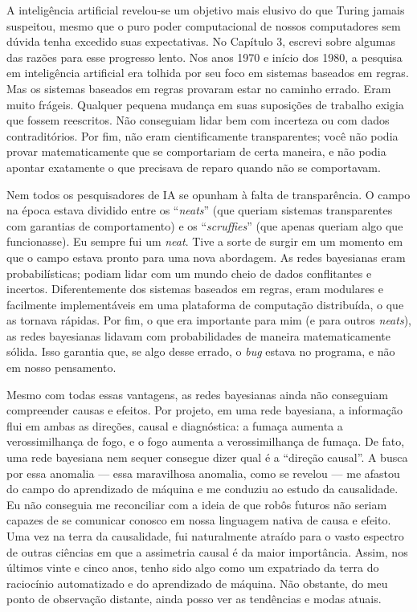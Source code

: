 \documentclass[11pt,a5paper,twoside]{book}
\begin{document}
A inteligência artificial revelou-se um objetivo mais elusivo do que Turing jamais suspeitou, mesmo que o puro poder computacional de nossos computadores sem dúvida tenha excedido suas expectativas. No Capítulo 3, escrevi sobre algumas das razões para esse progresso lento. Nos anos 1970 e início dos 1980, a pesquisa em inteligência artificial era tolhida por seu foco em sistemas baseados em regras. Mas os sistemas baseados em regras provaram estar no caminho errado. Eram muito frágeis. Qualquer pequena mudança em suas suposições de trabalho exigia que fossem reescritos. Não conseguiam lidar bem com incerteza ou com dados contraditórios. Por fim, não eram cientificamente transparentes; você não podia provar matematicamente que se comportariam de certa maneira, e não podia apontar exatamente o que precisava de reparo quando não se comportavam.

Nem todos os pesquisadores de IA se opunham à falta de transparência. O campo na época estava dividido entre os “\textit{neats}” (que queriam sistemas transparentes com garantias de comportamento) e os “\textit{scruffies}” (que apenas queriam algo que funcionasse). Eu sempre fui um \textit{neat}. Tive a sorte de surgir em um momento em que o campo estava pronto para uma nova abordagem. As redes bayesianas eram probabilísticas; podiam lidar com um mundo cheio de dados conflitantes e incertos. Diferentemente dos sistemas baseados em regras, eram modulares e facilmente implementáveis em uma plataforma de computação distribuída, o que as tornava rápidas. Por fim, o que era importante para mim (e para outros \textit{neats}), as redes bayesianas lidavam com probabilidades de maneira matematicamente sólida. Isso garantia que, se algo desse errado, o \textit{bug} estava no programa, e não em nosso pensamento.

Mesmo com todas essas vantagens, as redes bayesianas ainda não conseguiam compreender causas e efeitos. Por projeto, em uma rede bayesiana, a informação flui em ambas as direções, causal e diagnóstica: a fumaça aumenta a verossimilhança de fogo, e o fogo aumenta a verossimilhança de fumaça. De fato, uma rede bayesiana nem sequer consegue dizer qual é a “direção causal”. A busca por essa anomalia — essa maravilhosa anomalia, como se revelou — me afastou do campo do aprendizado de máquina e me conduziu ao estudo da causalidade. Eu não conseguia me reconciliar com a ideia de que robôs futuros não seriam capazes de se comunicar conosco em nossa linguagem nativa de causa e efeito. Uma vez na terra da causalidade, fui naturalmente atraído para o vasto espectro de outras ciências em que a assimetria causal é da maior importância. Assim, nos últimos vinte e cinco anos, tenho sido algo como um expatriado da terra do raciocínio automatizado e do aprendizado de máquina. Não obstante, do meu ponto de observação distante, ainda posso ver as tendências e modas atuais.
\end{document}
